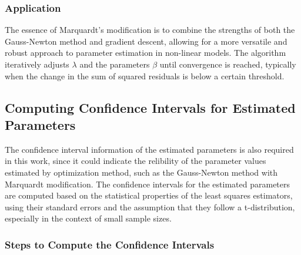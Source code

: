 \documentclass[12pt]{article} %
\begin{document}
\subsubsection{Application}
The essence of Marquardt's modification is to combine the strengths of both the Gauss-Newton method and gradient descent, allowing for a more versatile and robust approach to parameter estimation in non-linear models. The algorithm iteratively adjusts $\lambda$ and the parameters $\beta$ until convergence is reached, typically when the change in the sum of squared residuals is below a certain threshold.

\subsection{Computing Confidence Intervals for Estimated Parameters}

The confidence interval information of the estimated parameters is also required in this work, since it could indicate the relibility of the parameter values estimated by optimization method, such as the Gauss-Newton method with Marquardt modification. The confidence intervals for the estimated parameters are computed based on the statistical properties of the least squares estimators, using their standard errors and the assumption that they follow a t-distribution, especially in the context of small sample sizes.

\subsubsection{Steps to Compute the Confidence Intervals}
\end{document}
